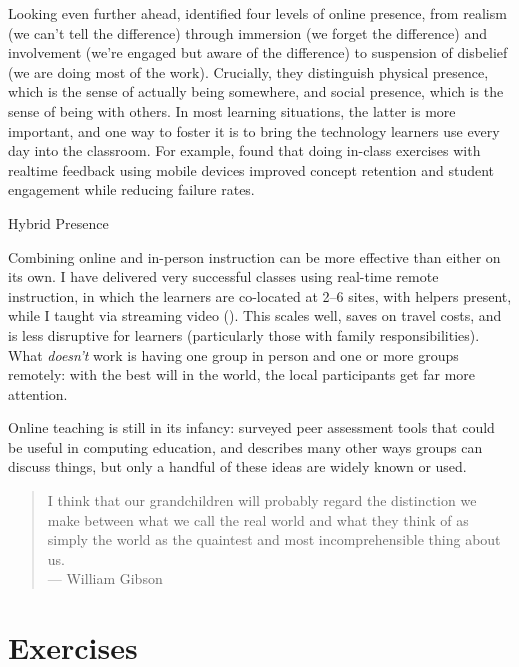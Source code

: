 Looking even further ahead, \cite{Ijss2000} identified four levels of
online presence, from realism (we can't tell the difference) through
immersion (we forget the difference) and involvement (we're engaged
but aware of the difference) to suspension of disbelief (we are doing
most of the work).  Crucially, they distinguish physical presence,
which is the sense of actually being somewhere, and social presence,
which is the sense of being with others. In most learning situations,
the latter is more important, and one way to foster it is to bring the
technology learners use every day into the classroom.  For example,
\cite{Deb2018} found that doing in-class exercises with realtime
feedback using mobile devices improved concept retention and student
engagement while reducing failure rates.

\begin{callout}{Hybrid Presence}

  Combining online and in-person instruction can be more effective
  than either on its own.  I have delivered very successful classes
  using real-time remote instruction, in which the learners are
  co-located at 2--6 sites, with helpers present, while I taught via
  streaming video ().  This scales well, saves
  on travel costs, and is less disruptive for learners (particularly
  those with family responsibilities).  What \emph{doesn't} work is
  having one group in person and one or more groups remotely: with the
  best will in the world, the local participants get far more
  attention.

\end{callout}

Online teaching is still in its infancy: \cite{Luxt2009} surveyed peer
assessment tools that could be useful in computing education, and
\cite{Broo2016} describes many other ways groups can discuss things,
but only a handful of these ideas are widely known or used.

\begin{quote}

  I think that our grandchildren will probably regard the distinction
  we make between what we call the real world and what they think of
  as simply the world as the quaintest and most incomprehensible thing
  about us. \\
  --- William Gibson

\end{quote}

\section{Exercises}\label{s:online-exercises}

